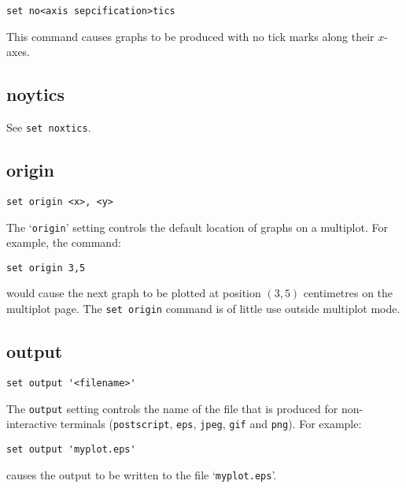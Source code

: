 \documentclass[a4paper,onecolumn,11pt]{book}
\begin{document}
\begin{verbatim}
set no<axis sepcification>tics
\end{verbatim}

This command causes graphs to be produced with no tick marks along their $x$-axes.

\subsection{noytics}

See {\tt set noxtics}.


\subsection{origin}

\begin{verbatim}
set origin <x>, <y>
\end{verbatim}

The `{\tt origin}' setting controls the default location of graphs on a multiplot.
For example, the command:

\begin{verbatim}
set origin 3,5
\end{verbatim}

\noindent would cause the next graph to be plotted at position $(3,5)$ centimetres on the
multiplot page. The {\tt set origin} command is of little use outside multiplot
mode.


\subsection{output}

\begin{verbatim}
set output '<filename>'
\end{verbatim}

The {\tt output} setting controls the name of the file that is produced for
non-interactive terminals ({\tt postscript}, {\tt eps}, {\tt jpeg}, {\tt gif}
and {\tt png}).  For example:

\begin{verbatim}
set output 'myplot.eps'
\end{verbatim}

\noindent causes the output to be written to the file `{\tt myplot.eps}'.
\end{document}
